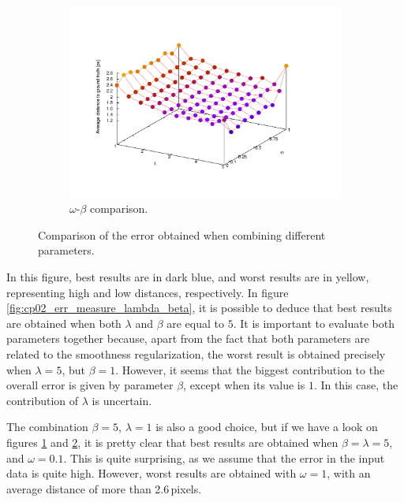 \begin{figure}[t]
\begin{subfigure}[b]{0.33\textwidth}
                \label{fig:cp02_err_measure_lambda_omega}
        \end{subfigure}%
        ~ %
        \begin{subfigure}[b]{0.33\textwidth}
                \centering
                \includegraphics[width=\textwidth, trim=80 80 150 100,clip]{fig26.pdf}
                \caption{$\omega$-$\beta$ comparison.}
                \label{fig:cp02_err_measure_omega_beta}
        \end{subfigure}%

        \caption{Comparison of the error obtained when combining different parameters.}\label{fig:cp02_err_measure_parameterization}
\end{figure}

In this figure, best results are in dark blue, and worst results are in yellow, representing high and low distances, 
respectively. In figure \ref{fig:cp02_err_measure_lambda_beta}, it is possible to deduce that best results are obtained when 
both $\lambda$ and $\beta$ are equal to $5$. It is important to evaluate both parameters together because, apart from 
the fact that both parameters are related to the smoothness regularization, the worst result is obtained precisely when 
$\lambda=5$, but $\beta=1$. However, it seems that the biggest contribution to the overall error is given by parameter 
$\beta$, except when its value is $1$. In this case, the contribution of $\lambda$ is uncertain.

The combination $\beta = 5$, $\lambda = 1$ is also a good choice, but if we have a look on figures \ref{fig:cp02_err_measure_lambda_omega} and \ref{fig:cp02_err_measure_omega_beta}, it is pretty clear that best results are obtained when $\beta=\lambda=5$, and $\omega=0.1$. This is quite surprising, as we assume that the error in the input data is quite high. However, worst results are obtained with $\omega=1$, with an average distance of more than 2.6\,pixels.

